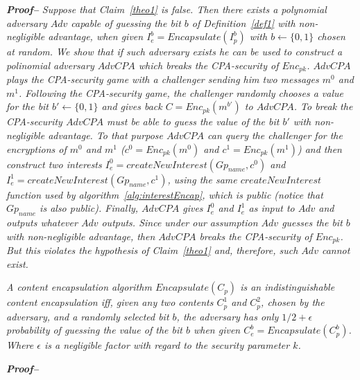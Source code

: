 \textit{\textbf{Proof--} Suppose that Claim~\ref{theo1} is false. Then there exists a polynomial adversary $Adv$ capable of guessing the bit $b$ of Definition~\ref{def1} with non-negligible advantage, when given $I_e^b = Encapsulate(I_p^b)$ with $b \leftarrow \{0,1\}$ chosen at random. We show that if such adversary exists he can be used to construct a polinomial adversary $AdvCPA$ which breaks the CPA-security of $Enc_{pk}$. $AdvCPA$ plays the CPA-security game with a challenger sending him two messages $m^0$ and $m^1$. Following the CPA-security game, the challenger randomly chooses a value for the bit $b' \leftarrow \{0,1\}$ and gives back $C = Enc_{pk}(m^{b'})$ to $AdvCPA$. To break the CPA-security $AdvCPA$ must be able to guess the value of the bit $b'$ with non-negligible advantage. To that purpose $AdvCPA$ can query the challenger for the encryptions of $m^0$ and $m^1$ ($c^0 = Enc_{pk}(m^0)$ and $c^1 = Enc_{pk}(m^1)$) and then construct two interests $I_e^0 = createNewInterest(Gp_{name}, c^0)$ and $I_e^1 = createNewInterest(Gp_{name}, c^1)$, using the same $createNewInterest$ function used by algorithm~\ref{alg:interestEncap}, which is public (notice that $Gp_{name}$ is also public). Finally, $AdvCPA$ gives $I_e^0$ and $I_e^1$ as input to $Adv$ and outputs whatever $Adv$ outputs. Since under our assumption $Adv$ guesses the bit $b$ with non-negligible advantage, then $AdvCPA$ breaks the CPA-security of $Enc_{pk}$. But this violates the hypothesis of Claim~\ref{theo1} and, therefore, such $Adv$ cannot exist.
}


\begin{definition}
\textit{
A content encapsulation algorithm $Encapsulate(C_p)$ is an indistinguishable content encapsulation iff, given any two contents $C_p^1$ and $C_p^2$, chosen by the adversary, and a randomly selected bit $b$, the adversary has only $1/2 + \epsilon$ probability of guessing the value of the bit $b$ when given $C_e^b = Encapsulate(C_p^b)$. Where $\epsilon$ is a negligible factor with regard to the security parameter $k$.
}
\end{definition}


\textbf{\textit{Proof--}}
